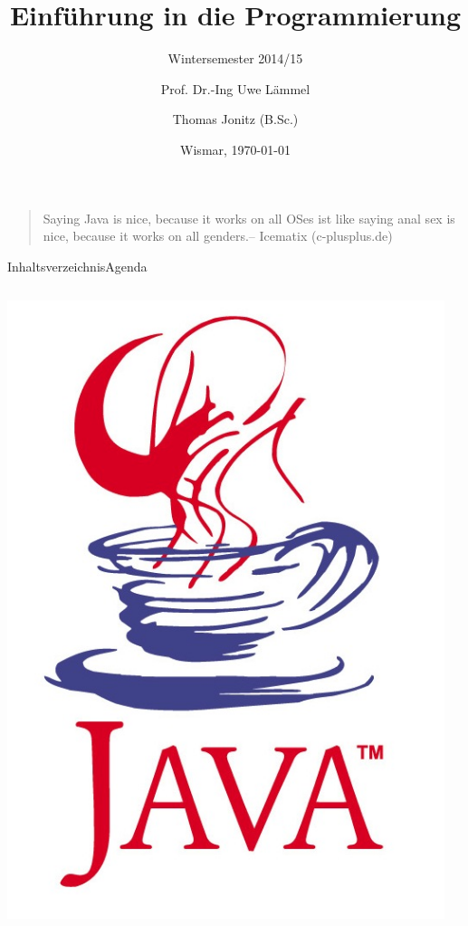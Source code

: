 \documentclass{hswbeamer}
\title[EiP]{Einführung in die Programmierung}
\subtitle[WS 2014/15]{Wintersemester 2014/15}
\author[\Copyright{Uwe L\"{a}mmel, Thomas Jonitz}]{Prof. Dr.-Ing Uwe L\"{a}mmel \and Thomas Jonitz (B.Sc.)}
\date{Wismar, \today}
\begin{document}
\begin{frame}
    \begin{quote}
        \glqq Saying Java is nice, because it works on all OSes ist like saying anal sex is nice, because it works on all genders.\grqq -- Icematix (c-plusplus.de)
    \end{quote}
\end{frame}

\begin{frame}
    \maketitle
\end{frame}

\begin{frame}{Inhaltsverzeichnis}{Agenda}
    \begin{columns}
        \begin{column}{0.4\textwidth}
            \includegraphics[width=0.9\columnwidth]{img/java-tm.jpg}
        \end{column}
        \begin{column}{0.6\textwidth}
            \tableofcontents%
        \end{column}
    \end{columns}
\end{frame}
\end{document}

